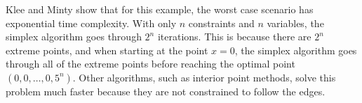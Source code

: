%
%
%
%

Klee and Minty show that for this example, the worst case scenario has exponential time complexity.
With only $n$ constraints and $n$ variables, the simplex algorithm goes through $2^n$ iterations.
This is because there are $2^n$ extreme points, and when starting at the point $x=0$, the simplex algorithm goes through all of the extreme points before reaching the optimal point $(0,0,\dots, 0, 5^n)$.
Other algorithms, such as interior point methods, solve this problem much faster because they are not constrained to follow the edges.

\printbibliography

